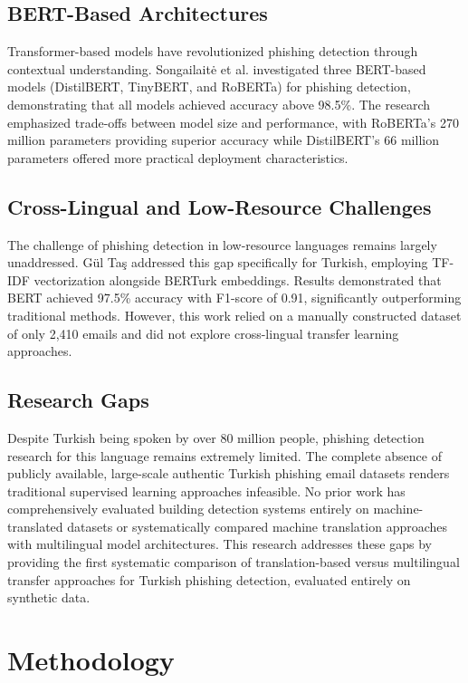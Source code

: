 \documentclass[conference]{IEEEtran}
\begin{document}
\subsection{BERT-Based Architectures}

Transformer-based models have revolutionized phishing detection through contextual understanding. Songailaitė et al. \cite{12} investigated three BERT-based models (DistilBERT, TinyBERT, and RoBERTa) for phishing detection, demonstrating that all models achieved accuracy above 98.5\%. The research emphasized trade-offs between model size and performance, with RoBERTa's 270 million parameters providing superior accuracy while DistilBERT's 66 million parameters offered more practical deployment characteristics.

\subsection{Cross-Lingual and Low-Resource Challenges}

The challenge of phishing detection in low-resource languages remains largely unaddressed. Gül Taş \cite{13} addressed this gap specifically for Turkish, employing TF-IDF vectorization alongside BERTurk embeddings. Results demonstrated that BERT achieved 97.5\% accuracy with F1-score of 0.91, significantly outperforming traditional methods. However, this work relied on a manually constructed dataset of only 2,410 emails and did not explore cross-lingual transfer learning approaches.

\subsection{Research Gaps}

Despite Turkish being spoken by over 80 million people, phishing detection research for this language remains extremely limited. The complete absence of publicly available, large-scale authentic Turkish phishing email datasets renders traditional supervised learning approaches infeasible. No prior work has comprehensively evaluated building detection systems entirely on machine-translated datasets or systematically compared machine translation approaches with multilingual model architectures. This research addresses these gaps by providing the first systematic comparison of translation-based versus multilingual transfer approaches for Turkish phishing detection, evaluated entirely on synthetic data.

\section{Methodology}
\end{document}
